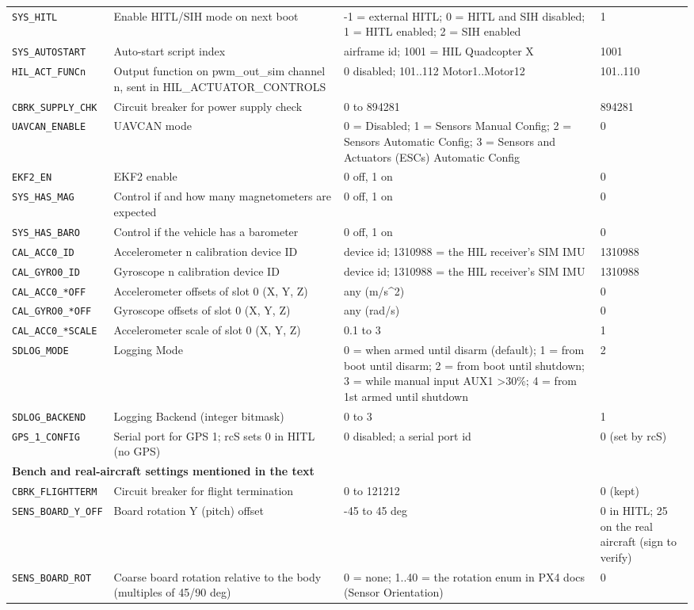 \documentclass[11pt,a4paper]{article}
\newcommand{\param}[1]{\texttt{#1}}
\begin{document}
{\begin{longtable}{@{}p{3.3cm}p{5.6cm}p{3.6cm}p{1.9cm}@{}}
\midrule
\param{SYS\_HITL} & Enable HITL/SIH mode on next boot & -1 = external HITL; 0 = HITL and SIH disabled; 1 = HITL enabled; 2 = SIH enabled & 1 \\
\param{SYS\_AUTOSTART} & Auto-start script index & airframe id; 1001 = HIL Quadcopter X & 1001 \\
\param{HIL\_ACT\_FUNCn} & Output function on pwm\_out\_sim channel n, sent in HIL\_ACTUATOR\_CONTROLS & 0 disabled; 101..112 Motor1..Motor12 & 101..110 \\
\param{CBRK\_SUPPLY\_CHK} & Circuit breaker for power supply check & 0 to 894281 & 894281 \\
\param{UAVCAN\_ENABLE} & UAVCAN mode & 0 = Disabled; 1 = Sensors Manual Config; 2 = Sensors Automatic Config; 3 = Sensors and Actuators (ESCs) Automatic Config & 0 \\
\param{EKF2\_EN} & EKF2 enable & 0 off, 1 on & 0 \\
\param{SYS\_HAS\_MAG} & Control if and how many magnetometers are expected & 0 off, 1 on & 0 \\
\param{SYS\_HAS\_BARO} & Control if the vehicle has a barometer & 0 off, 1 on & 0 \\
\param{CAL\_ACC0\_ID} & Accelerometer n calibration device ID & device id; 1310988 = the HIL receiver's SIM IMU & 1310988 \\
\param{CAL\_GYRO0\_ID} & Gyroscope n calibration device ID & device id; 1310988 = the HIL receiver's SIM IMU & 1310988 \\
\param{CAL\_ACC0\_*OFF} & Accelerometer offsets of slot 0 (X, Y, Z) & any (m/s\^{}2) & 0 \\
\param{CAL\_GYRO0\_*OFF} & Gyroscope offsets of slot 0 (X, Y, Z) & any (rad/s) & 0 \\
\param{CAL\_ACC0\_*SCALE} & Accelerometer scale of slot 0 (X, Y, Z) & 0.1 to 3 & 1 \\
\param{SDLOG\_MODE} & Logging Mode & 0 = when armed until disarm (default); 1 = from boot until disarm; 2 = from boot until shutdown; 3 = while manual input AUX1 \textgreater{}30\%; 4 = from 1st armed until shutdown & 2 \\
\param{SDLOG\_BACKEND} & Logging Backend (integer bitmask) & 0 to 3 & 1 \\
\param{GPS\_1\_CONFIG} & Serial port for GPS 1; rcS sets 0 in HITL (no GPS) & 0 disabled; a serial port id & 0 (set by rcS) \\
\midrule
\multicolumn{4}{l}{\textbf{Bench and real-aircraft settings mentioned in the text}} \\
\midrule
\param{CBRK\_FLIGHTTERM} & Circuit breaker for flight termination & 0 to 121212 & 0 (kept) \\
\param{SENS\_BOARD\_Y\_OFF} & Board rotation Y (pitch) offset & -45 to 45 deg & 0 in HITL; 25 on the real aircraft (sign to verify) \\
\param{SENS\_BOARD\_ROT} & Coarse board rotation relative to the body (multiples of 45/90 deg) & 0 = none; 1..40 = the rotation enum in PX4 docs (Sensor Orientation) & 0 \\
\bottomrule
\end{longtable}
}
\end{document}
